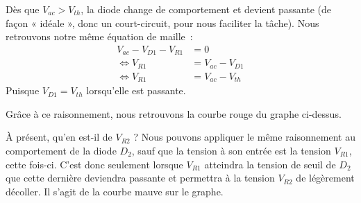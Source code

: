 \documentclass{../../template/tp}
\begin{document}
{Dès que $V_{ac} > V_{th}$, la diode change de comportement et devient passante (de façon « idéale », donc un court-circuit, pour nous faciliter la tâche).
Nous retrouvons notre même équation de maille~:
\begin{align*}
V_{ac} - V_{D1} - V_{R1} &= 0 \\
\Leftrightarrow V_{R1} &= V_{ac} - V_{D1} \\
\Leftrightarrow V_{R1} &= V_{ac} - V_{th}
\end{align*}
Puisque $V_{D1} = V_{th}$ lorsqu'elle est passante.

Grâce à ce raisonnement, nous retrouvons la courbe rouge du graphe ci-dessus.

À présent, qu'en est-il de $V_{R2}$ ?
Nous pouvons appliquer le même raisonnement au comportement de la diode $D_2$, sauf que la tension à son entrée est la tension $V_{R1}$, cette fois-ci.
C'est donc seulement lorsque $V_{R1}$ atteindra la tension de seuil de $D_2$ que cette dernière deviendra passante et permettra à la tension $V_{R2}$ de légèrement décoller.
Il s'agit de la courbe mauve sur le graphe.

}
\end{document}
